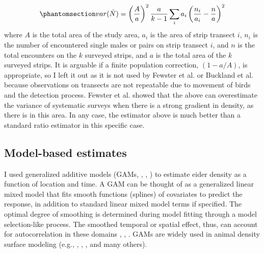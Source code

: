\documentclass[
  10pt,
  letterpaper,
]{article}
\begin{document}
\begin{equation}\phantomsection\label{eq-2}{var(\hat N) = \left( \frac{A}{a} \right)^2 \frac{a}{k-1} \sum_i a_i\left( \frac{n_i}{a_i} - \frac{n}{a} \right)^2}\end{equation}
where \(A\) is the total area of the study area, \(a_i\) is the area of
strip transect \(i\), \(n_i\) is the number of encountered single males
or pairs on strip transect \(i\), and \(n\) is the total encounters on
the \(k\) surveyed strips, and \(a\) is the total area of the \(k\)
surveyed strips. It is arguable if a finite population correction,
\((1 - a/A)\), is appropriate, so I left it out as it is not used by
Fewster et al. \citep{fewster2009} or Buckland et al.
\citep{buckland2001} because observations on transects are not
repeatable due to movement of birds and the detection process. Fewster
et al. \citep{fewster2009} showed that the above can overestimate the
variance of systematic surveys when there is a strong gradient in
density, as there is in this area. In any case, the estimator above is
much better than a standard ratio estimator in this specific case.

\subsection{Model-based estimates}\label{model-based-estimates}

I used generalized additive models (GAMs, \citep{hastie1986generalized},
\citep{wood2017}, \citep{pedersen2019hierarchical}) to estimate eider
density as a function of location and time. A GAM can be thought of as a
generalized linear mixed model that fits smooth functions (splines) of
covariates to predict the response, in addition to standard linear mixed
model terms if specified. The optimal degree of smoothing is determined
during model fitting through a model selection-like process. The
smoothed temporal or spatial effect, thus, can account for
autocorrelation in these domains \citep{wood2017},
\citep{pedersen2019hierarchical}, \citep{hefley2017basis}. GAMs are
widely used in animal density surface modeling (e.g.,
\citep{miller2013}, \citep{amundson2019}, \citep{hollmen2023climate},
and many others).
\end{document}
